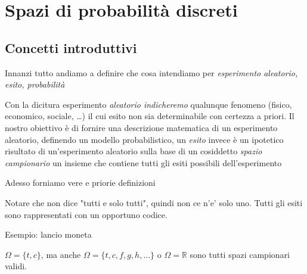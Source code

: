 \chapter{Spazi di probabilità discreti}
\section{Concetti introduttivi}
Innanzi tutto andiamo a definire che cosa intendiamo per \textit{esperimento aleatorio, esito, probabilità}

Con la dicitura esperimento \textit{aleatorio indicheremo} qualunque fenomeno (fisico, economico, sociale, \dots ) il cui esito non sia determinabile con certezza a priori. Il nostro obiettivo è di fornire una descrizione matematica di un esperimento aleatorio, definendo un modello probabilistico, un \textit{esito} invece è un ipotetico risultato di un'esperimento aleatorio sulla base di un cosiddetto \textit{spazio campionario} un insieme che contiene tutti gli esiti possibili dell’esperimento



Adesso forniamo vere e priorie definizioni


Notare che non dice "tutti e solo tutti", quindi non ce n'e' solo uno. Tutti gli esiti sono rappresentati con un opportuno codice.

Esempio: lancio moneta

$ \Omega = \{t,c\} $, ma anche $ \Omega = \{t,c,f,g,h,...\}$ o $\Omega = \mathbb{R} $ sono tutti spazi campionari validi.







